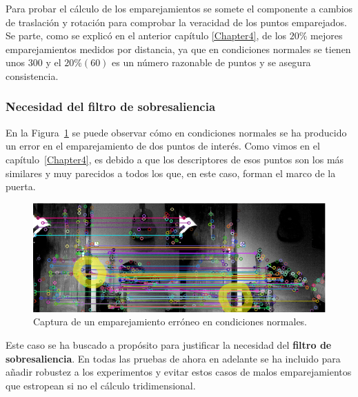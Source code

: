 Para probar el cálculo de los emparejamientos se somete el componente a cambios de traslación y rotación para comprobar la veracidad de los puntos emparejados. Se parte, como se explicó en el anterior capítulo \ref{Chapter4}, de los $20\%$ mejores emparejamientos medidos por distancia, ya que en condiciones normales se tienen unos $300$ y el $20\% (60)$ es un número razonable de puntos y se asegura consistencia.

\subsubsection{Necesidad del filtro de sobresaliencia}

En la Figura~\ref{fig:error-matching} se puede observar cómo en condiciones normales se ha producido un error en el emparejamiento de dos puntos de interés. Como vimos en el capítulo~\ref{Chapter4}, es debido a que los descriptores de esos puntos son los más similares y muy parecidos a todos los que, en este caso, forman el marco de la puerta.


\begin{figure}[th]
\centering
\includegraphics[scale=0.6]{Figures/tests/matching-error.png}
\decoRule
\caption[Captura con un error de emparejamiento sin filtro de sobresaliencia]{Captura de un emparejamiento erróneo en condiciones normales.}
\label{fig:error-matching}
\end{figure}

Este caso se ha buscado a propósito para justificar la necesidad del \textbf{filtro de sobresaliencia}. En todas las pruebas de ahora en adelante se ha incluido para añadir robustez a los experimentos y evitar estos casos de malos emparejamientos que estropean si no el cálculo tridimensional.

